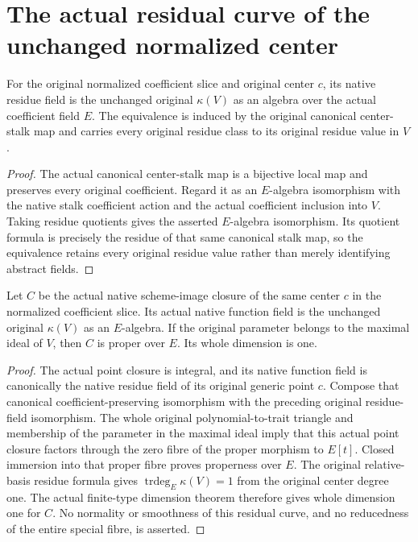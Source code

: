 \section{The actual residual curve of the unchanged normalized center}
\begin{theorem}\label{thm:normalized-center-original-residue-field}
For the original normalized coefficient slice and original center $c$, its native residue field is the unchanged original $\kappa(V)$ as an algebra over the actual coefficient field $E$. The equivalence is induced by the original canonical center-stalk map and carries every original residue class to its original residue value in $V$.
\leanok
\end{theorem}
\begin{proof}
The actual canonical center-stalk map is a bijective local map and preserves every original coefficient. Regard it as an $E$-algebra isomorphism with the native stalk coefficient action and the actual coefficient inclusion into $V$. Taking residue quotients gives the asserted $E$-algebra isomorphism. Its quotient formula is precisely the residue of that same canonical stalk map, so the equivalence retains every original residue value rather than merely identifying abstract fields.
\end{proof}
\begin{theorem}\label{thm:normalized-center-actual-residual-curve}
Let $C$ be the actual native scheme-image closure of the same center $c$ in the normalized coefficient slice. Its actual native function field is the unchanged original $\kappa(V)$ as an $E$-algebra. If the original parameter belongs to the maximal ideal of $V$, then $C$ is proper over $E$. Its whole dimension is one.
\leanok
\end{theorem}
\begin{proof}
The actual point closure is integral, and its native function field is canonically the native residue field of its original generic point $c$. Compose that canonical coefficient-preserving isomorphism with the preceding original residue-field isomorphism. The whole original polynomial-to-trait triangle and membership of the parameter in the maximal ideal imply that this actual point closure factors through the zero fibre of the proper morphism to $E[t]$. Closed immersion into that proper fibre proves properness over $E$. The original relative-basis residue formula gives $\operatorname{trdeg}_E\kappa(V)=1$ from the original center degree one. The actual finite-type dimension theorem therefore gives whole dimension one for $C$. No normality or smoothness of this residual curve, and no reducedness of the entire special fibre, is asserted.
\end{proof}
